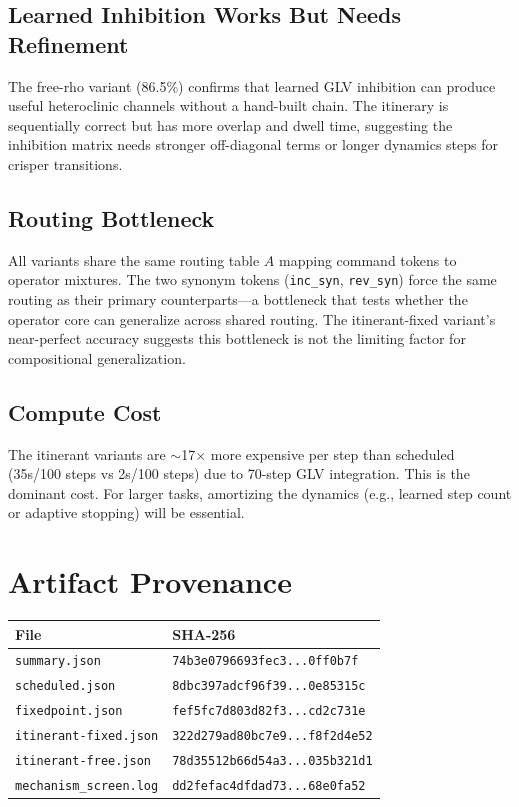 \documentclass[11pt]{article}
\begin{document}
\subsection{Learned Inhibition Works But Needs Refinement}
The free-rho variant (86.5\%) confirms that learned GLV inhibition can produce useful heteroclinic channels without a hand-built chain. The itinerary is sequentially correct but has more overlap and dwell time, suggesting the inhibition matrix needs stronger off-diagonal terms or longer dynamics steps for crisper transitions.

\subsection{Routing Bottleneck}
All variants share the same routing table $A$ mapping command tokens to operator mixtures. The two synonym tokens (\texttt{inc\_syn}, \texttt{rev\_syn}) force the same routing as their primary counterparts---a bottleneck that tests whether the operator core can generalize across shared routing. The itinerant-fixed variant's near-perfect accuracy suggests this bottleneck is not the limiting factor for compositional generalization.

\subsection{Compute Cost}
The itinerant variants are $\sim$17$\times$ more expensive per step than scheduled (35s/100 steps vs 2s/100 steps) due to 70-step GLV integration. This is the dominant cost. For larger tasks, amortizing the dynamics (e.g., learned step count or adaptive stopping) will be essential.

\section{Artifact Provenance}

\begin{table}[H]
\centering
\begin{tabular}{ll}
\toprule
\textbf{File} & \textbf{SHA-256} \\
\midrule
\texttt{summary.json} & \texttt{74b3e0796693fec3...0ff0b7f} \\
\texttt{scheduled.json} & \texttt{8dbc397adcf96f39...0e85315c} \\
\texttt{fixedpoint.json} & \texttt{fef5fc7d803d82f3...cd2c731e} \\
\texttt{itinerant-fixed.json} & \texttt{322d279ad80bc7e9...f8f2d4e52} \\
\texttt{itinerant-free.json} & \texttt{78d35512b66d54a3...035b321d1} \\
\texttt{mechanism\_screen.log} & \texttt{dd2fefac4dfdad73...68e0fa52} \\
\bottomrule
\end{tabular}
\end{table}
\end{document}
